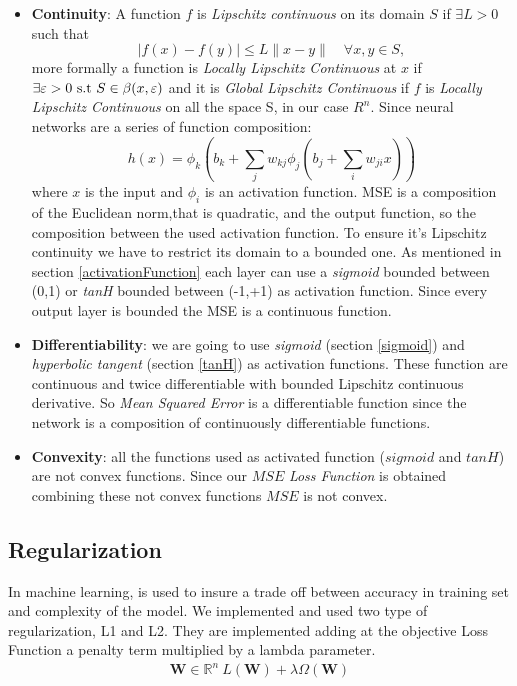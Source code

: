\begin{itemize}
	\item \textbf{Continuity}: A function $f$ is \textit{ Lipschitz continuous} on its domain $S$ if $\exists L>0$ such that
	\begin{equation}
	|f(x)-f(y)| \leq L\parallel x-y\parallel \quad \forall x,y \in S,  
	\end{equation} 
	more formally a function is  \textit{Locally Lipschitz Continuous} at $x$ if $\exists \varepsilon >0 \textnormal{ s.t } S \in \beta(x,\varepsilon) $
	and it is \textit{Global Lipschitz Continuous} if $f$ is \textit{Locally Lipschitz Continuous} on all the space S, in our case $R^n$.
	Since neural networks are a series of function composition: 
	\begin{equation}
	h(x) = \phi_{k}(b_{k} + \sum_{j}w_{kj} \phi_{j}(b_{j} + \sum_{i}w_{ji}x))
	\end{equation}
	where $x$ is the input and $\phi_{i}$ is an activation function. MSE is a composition of the Euclidean norm,that is quadratic, and the output function, so the composition between the used activation function. To ensure it's Lipschitz continuity we have to restrict its domain to a bounded one. As mentioned in section \ref{activationFunction} each layer can use a \textit{sigmoid} bounded between (0,1) or \textit{tanH} bounded between (-1,+1) as activation function. Since every output layer is bounded the MSE is a continuous function.
	
	\item  \textbf{Differentiability}:  we are going to use \textit{sigmoid} (section \ref{sigmoid}) and \textit{hyperbolic tangent} (section \ref{tanH}) as activation functions. These function are continuous and twice differentiable with bounded Lipschitz continuous derivative. So \textit{Mean Squared Error} is a differentiable function since the network is a composition of continuously differentiable functions.
	\item \textbf{Convexity}: all the functions used as activated function ($sigmoid$ and $tanH$) are not convex functions. Since our $MSE$ \textit{Loss Function} is obtained combining these not convex functions $MSE$ is not convex.
\end{itemize}

\subsection{Regularization}
 In machine learning, is used to insure a trade off between accuracy in training set and complexity of the model.
 We implemented and used two type of regularization, L1 and L2. They are implemented adding at the objective Loss Function a penalty term multiplied by a lambda parameter.
\begin{align*}
	{\mathbf{W} \in \mathbb{R}^n} {\ \mathit{L}(\mathbf{W}) + \lambda\Omega(\mathbf{W})}{}{}
	\label{eq:reg}
\end{align*}
 
